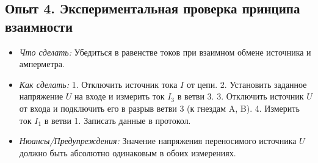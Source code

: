 \subsection*{Опыт 4. Экспериментальная проверка принципа взаимности}
\begin{itemize}
    \item \textit{Что сделать:} Убедиться в равенстве токов при взаимном обмене источника и амперметра.
    \item \textit{Как сделать:}
    1. Отключить источник тока $I$ от цепи.
    2. Установить заданное напряжение $U$ на входе и измерить ток $I_3$ в ветви 3.
    3. Отключить источник $U$ от входа и подключить его в разрыв ветви 3 (к гнездам A, B).
    4. Измерить ток $I_1$ в ветви 1. Записать данные в протокол.
    \item \textit{Нюансы/Предупреждения:} Значение напряжения переносимого источника $U$ должно быть абсолютно одинаковым в обоих измерениях.
\end{itemize}

